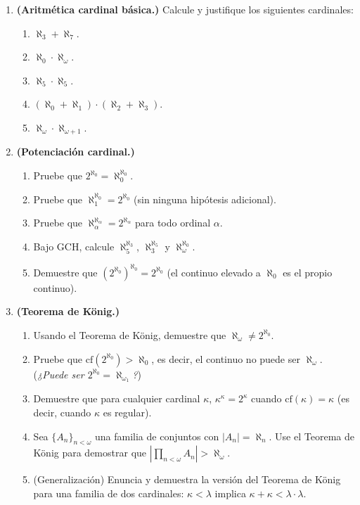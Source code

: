 \begin{enumerate}[leftmargin=2em, label=\textbf{\arabic*.}]

\item \textbf{(Aritmética cardinal básica.)}
Calcule y justifique los siguientes cardinales:
\begin{enumerate}[label=(\alph*)]
  \item $\aleph_3 + \aleph_7$.
  \item $\aleph_0 \cdot \aleph_{\omega}$.
  \item $\aleph_5 \cdot \aleph_5$.
  \item $(\aleph_0 + \aleph_1) \cdot (\aleph_2 + \aleph_3)$.
  \item $\aleph_\omega \cdot \aleph_{\omega+1}$.
\end{enumerate}

\item \textbf{(Potenciación cardinal.)}
\begin{enumerate}[label=(\alph*)]
  \item Pruebe que $2^{\aleph_0} = \aleph_0^{\aleph_0}$.
  \item Pruebe que $\aleph_1^{\aleph_0} = 2^{\aleph_0}$ (sin ninguna hipótesis adicional).
  \item Pruebe que $\aleph_\alpha^{\aleph_\alpha} = 2^{\aleph_\alpha}$ para todo ordinal $\alpha$.
  \item Bajo GCH, calcule $\aleph_5^{\aleph_3}$, $\aleph_3^{\aleph_5}$ y $\aleph_\omega^{\aleph_0}$.
  \item Demuestre que $(2^{\aleph_0})^{\aleph_0} = 2^{\aleph_0}$ (el continuo elevado a $\aleph_0$ es el propio continuo).
\end{enumerate}

\item \textbf{(Teorema de König.)}
\begin{enumerate}[label=(\alph*)]
  \item Usando el Teorema de König, demuestre que $\aleph_\omega \neq 2^{\aleph_0}$.
  \item Pruebe que $\mathrm{cf}(2^{\aleph_0}) > \aleph_0$, es decir, el continuo no puede ser $\aleph_\omega$. (\emph{¿Puede ser $2^{\aleph_0} = \aleph_{\omega_1}$?})
  \item Demuestre que para cualquier cardinal $\kappa$, $\kappa^\kappa = 2^\kappa$ cuando $\mathrm{cf}(\kappa) = \kappa$ (es decir, cuando $\kappa$ es regular).
  \item Sea $\{A_n\}_{n<\omega}$ una familia de conjuntos con $|A_n| = \aleph_n$. Use el Teorema de König para demostrar que $\left|\prod_{n<\omega} A_n\right| > \aleph_\omega$.
  \item (Generalización) Enuncia y demuestra la versión del Teorema de König para una familia de dos cardinales: $\kappa < \lambda$ implica $\kappa + \kappa < \lambda \cdot \lambda$.
\end{enumerate}


\end{enumerate}
